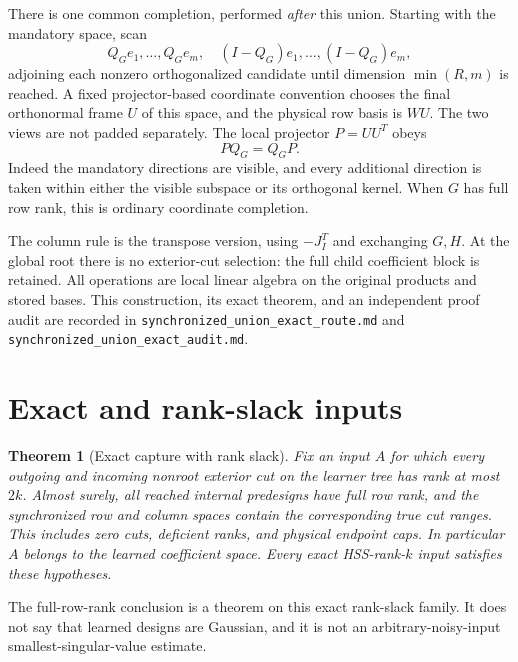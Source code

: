 \documentclass[11pt,oneside,openany,a4paper]{book}
\numberwithin{equation}{chapter}
\newtheorem{theorem}{Theorem}[chapter]
\theoremstyle{definition}
\theoremstyle{remark}
\newcommand{\sourcefile}[1]{{\small\nolinkurl{#1}}}
\begin{document}
There is one common completion, performed \emph{after} this union.
Starting with the mandatory space, scan
\[
 Q_Ge_1,\ldots,Q_Ge_m,
 \quad (I-Q_G)e_1,\ldots,(I-Q_G)e_m,
\]
adjoining each nonzero orthogonalized candidate until dimension
$\min(R,m)$ is reached.  A fixed projector-based coordinate convention
chooses the final orthonormal frame $U$ of this space, and the physical
row basis is $WU$.  The two views are not padded separately.
The local projector $P=UU^T$ obeys
\begin{equation}
 PQ_G=Q_GP.
 \label{upd:eq:route-commuting-completion}
\end{equation}
Indeed the mandatory directions are visible, and every additional
direction is taken within either the visible subspace or its orthogonal
kernel.  When $G$ has full row rank, this is ordinary coordinate
completion.

The column rule is the transpose version, using $-J_I^T$ and exchanging
$G,H$.  At the global root there is no exterior-cut selection: the full
child coefficient block is retained.  All operations are local linear
algebra on the original products and stored bases.  This construction,
its exact theorem, and an independent proof audit are recorded in
\sourcefile{synchronized_union_exact_route.md} and
\sourcefile{synchronized_union_exact_audit.md}.

\section{Exact and rank-slack inputs}

\begin{theorem}[Exact capture with rank slack]
\label{upd:thm:route-exact}
Fix an input $A$ for which every outgoing and incoming nonroot exterior
cut on the learner tree has rank at most $2k$.  Almost surely, all reached
internal predesigns have full row rank, and the synchronized row and
column spaces contain the corresponding true cut ranges.  This includes
zero cuts, deficient ranks, and physical endpoint caps.  In particular
$A$ belongs to the learned coefficient space.  Every exact HSS-rank-$k$
input satisfies these hypotheses.
\end{theorem}

The full-row-rank conclusion is a theorem on this exact rank-slack
family.  It does not say that learned designs are Gaussian, and it is
not an arbitrary-noisy-input smallest-singular-value estimate.
\end{document}

